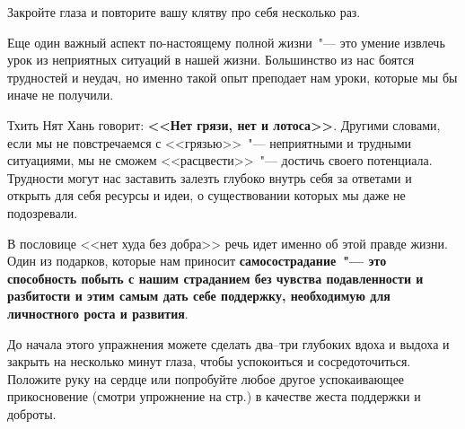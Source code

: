 \begin{center}
	{\large Закройте глаза и повторите вашу клятву про себя несколько раз.}
\end{center}

\vspace{3ex}


\newpage
{} \label{Ex:Silver_Linings}

Еще один важный аспект по-настоящему полной жизни~"--- это умение извлечь урок из неприятных ситуаций в нашей жизни. Большинство из нас боятся трудностей и неудач, но именно такой опыт преподает нам уроки, которые мы бы иначе не получили.

Тхить Нят Хань говорит: \textbf{<<Нет грязи, нет и лотоса>>}\cite{84}. Другими словами, если мы не повстречаемся с <<грязью>>~"--- неприятными и трудными ситуациями, мы не сможем <<расцвести>>~"--- достичь своего потенциала. Трудности могут нас заставить залезть глубоко внутрь себя за ответами и открыть для себя ресурсы и идеи, о существовании которых мы даже не подозревали. 

В пословице <<нет худа без добра>> речь идет именно об этой правде жизни. Один из подарков, которые нам приносит \textbf{самосострадание~"--- это способность побыть с нашим страданием без чувства подавленности и разбитости и этим самым дать себе поддержку, необходимую для личностного роста и развития}. 

До начала этого упражнения можете сделать два--три глубоких вдоха и выдоха и закрыть на несколько минут глаза, чтобы успокоиться и сосредоточиться. Положите руку на сердце или попробуйте любое другое успокаивающее прикосновение (смотри упрожнение на стр.\:\pageref{IP:Soothing_Touch}) в качестве жеста поддержки и доброты. 

